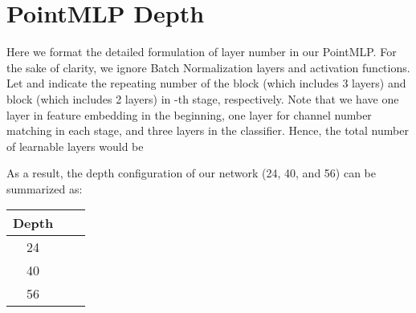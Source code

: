 \documentclass{article} \usepackage{iclr2022_conference,times}
\begin{document}
\section{PointMLP Depth}
\label{appendix:depth}
Here we format the detailed formulation of layer number in our PointMLP. For the sake of clarity, we ignore Batch Normalization layers and activation functions.
Let   and   indicate the repeating number of the  block (which includes 3 layers) and  block (which includes 2 layers) in -th stage, respectively. Note that we have one layer in feature embedding in the beginning, one layer for channel number matching in each stage, and three layers in the classifier. Hence, the total number of learnable layers  would be 

As a result, the depth configuration of our network (24, 40, and 56) can be summarized as:
\begin{table}[!h]
    \centering
    \begin{tabular}{c|c|c}
    \toprule
       Depth  &  &\\
       \midrule
         24&&  \\
         40& &   \\
         56& & \\
        \bottomrule 
    \end{tabular}
\end{table}
\end{document}
